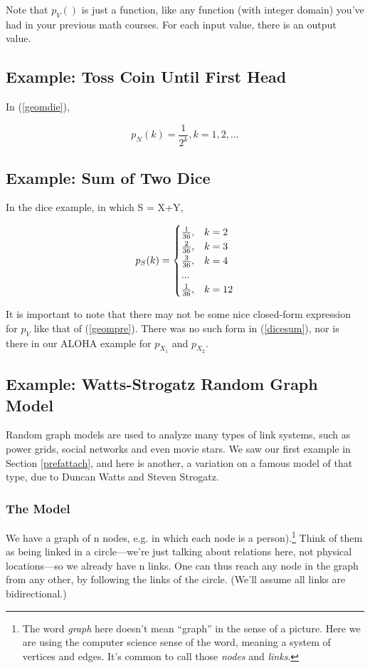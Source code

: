 Note that $p_V()$ is just a function, like any function (with integer
domain) you've had in your previous math courses.  For each input value,
there is an output value.

\subsection{Example:  Toss Coin Until First Head}

In (\ref{geomdie}),

\begin{equation}
\label{geompre}
p_N(k) = \frac{1}{2^k}, k = 1,2,...
\end{equation}

\subsection{Example:  Sum of Two Dice}

In the dice example, in which S = X+Y,

\begin{equation}
\label{dicesum}
p_S(k) = 
\begin{cases}
\frac{1}{36}, & k = 2 \cr
\frac{2}{36}, & k = 3 \cr
\frac{3}{36}, & k = 4 \cr
... \cr
\frac{1}{36}, & k = 12
\end{cases}
\end{equation}

It is important to note that there may not be some nice closed-form
expression for $p_V$ like that of (\ref{geompre}).  There was no such
form in (\ref{dicesum}), nor is there in our ALOHA example for
$p_{X_1}$ and $p_{X_2}$.

\subsection{Example:  Watts-Strogatz Random Graph Model}
\label{strogatz}

Random graph models are used to analyze many types of link systems, such
as power grids, social networks and even movie stars.  We saw our first
example in Section \ref{prefattach}, and here is another, a variation on
a famous model of that type, due to Duncan Watts and Steven Strogatz.

\subsubsection{The Model} 

We have a graph of n nodes, e.g. in which each node is a person).\footnote{The
word {\it graph} here doesn't mean ``graph'' in the sense of a picture.
Here we are using the computer science sense of the word, meaning a
system of vertices and edges.  It's common to call those {\it nodes} and
{\it links}.} Think of them as being linked in a circle---we're just
talking about relations here, not physical locations---so we already
have n links.  One can thus reach any node in the graph from any other,
by following the links of the circle.  (We'll assume all links are
bidirectional.)

